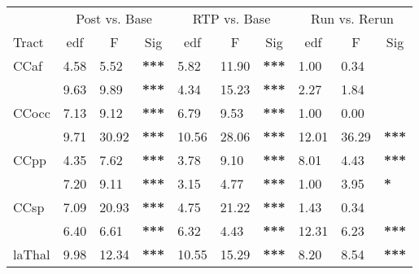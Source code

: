 
\begin{tabular}{llll|llllll}
 & \multicolumn{3}{c|}{Post vs. Base} & \multicolumn{3}{c|}{RTP vs. Base} & \multicolumn{3}{c}{Run vs. Rerun} \\ \cline{2-10}
Tract & \multicolumn{1}{c}{edf} & \multicolumn{1}{c}{F} & \multicolumn{1}{c|}{Sig} & \multicolumn{1}{c}{edf} & \multicolumn{1}{c}{F} & \multicolumn{1}{c|}{Sig} & \multicolumn{1}{c}{edf} & \multicolumn{1}{c}{F} & \multicolumn{1}{c}{Sig} \\ \hline
\multicolumn{1}{l|}{CCaf} & 4.58 & 5.52 & \textbf{***} & 5.82 & 11.90 & \multicolumn{1}{l|}{\textbf{***}} & 1.00 & 0.34 & \textbf{} \\
\rowcolor[HTML]{C0C0C0}
\multicolumn{1}{l|}{\cellcolor[HTML]{C0C0C0}CCmot} & 9.63 & 9.89 & \textbf{***} & 4.34 & 15.23 & \multicolumn{1}{l|}{\cellcolor[HTML]{C0C0C0}\textbf{***}} & 2.27 & 1.84 & \textbf{} \\
\multicolumn{1}{l|}{CCocc} & 7.13 & 9.12 & \textbf{***} & 6.79 & 9.53 & \multicolumn{1}{l|}{\textbf{***}} & 1.00 & 0.00 & \textbf{} \\
\rowcolor[HTML]{C0C0C0}
\multicolumn{1}{l|}{\cellcolor[HTML]{C0C0C0}CCorb} & 9.71 & 30.92 & \textbf{***} & 10.56 & 28.06 & \multicolumn{1}{l|}{\cellcolor[HTML]{C0C0C0}\textbf{***}} & 12.01 & 36.29 & \textbf{***} \\
\multicolumn{1}{l|}{CCpp} & 4.35 & 7.62 & \textbf{***} & 3.78 & 9.10 & \multicolumn{1}{l|}{\textbf{***}} & 8.01 & 4.43 & \textbf{***} \\
\rowcolor[HTML]{C0C0C0}
\multicolumn{1}{l|}{\cellcolor[HTML]{C0C0C0}CCsf} & 7.20 & 9.11 & \textbf{***} & 3.15 & 4.77 & \multicolumn{1}{l|}{\cellcolor[HTML]{C0C0C0}\textbf{***}} & 1.00 & 3.95 & \textbf{*} \\
\multicolumn{1}{l|}{CCsp} & 7.09 & 20.93 & \textbf{***} & 4.75 & 21.22 & \multicolumn{1}{l|}{\textbf{***}} & 1.43 & 0.34 & \textbf{} \\
\rowcolor[HTML]{C0C0C0}
\multicolumn{1}{l|}{\cellcolor[HTML]{C0C0C0}CCtemp} & 6.40 & 6.61 & \textbf{***} & 6.32 & 4.43 & \multicolumn{1}{l|}{\cellcolor[HTML]{C0C0C0}\textbf{***}} & 12.31 & 6.23 & \textbf{***} \\
\multicolumn{1}{l|}{laThal} & 9.98 & 12.34 & \textbf{***} & 10.55 & 15.29 & \multicolumn{1}{l|}{\textbf{***}} & 8.20 & 8.54 & \textbf{***} \\

\end{tabular}
